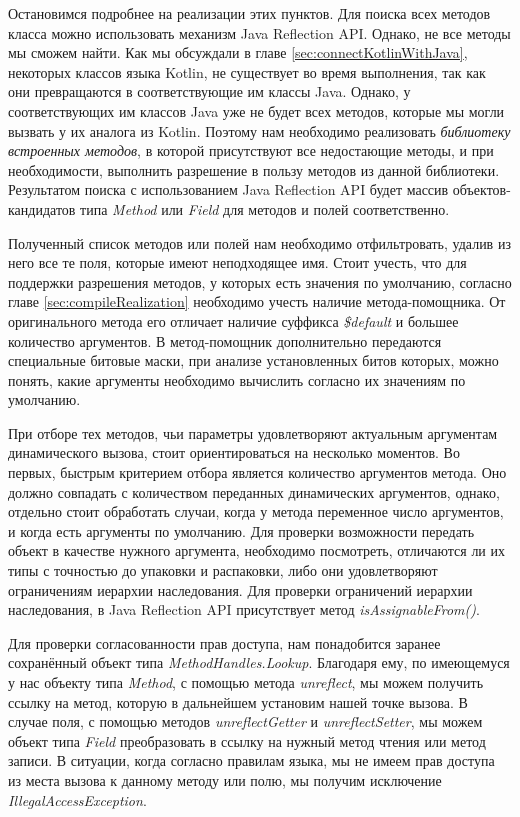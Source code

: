 Остановимся подробнее на реализации этих пунктов. Для поиска всех методов класса можно использовать механизм Java Reflection API. Однако, не все методы мы сможем найти. Как мы обсуждали в главе \ref{sec:connectKotlinWithJava}, некоторых классов языка Kotlin, не существует во время выполнения, так как они превращаются в соответствующие им классы Java. Однако, у соответствующих им классов Java уже не будет всех методов, которые мы могли вызвать у их аналога из Kotlin. Поэтому нам необходимо реализовать \textit{библиотеку встроенных методов}, в которой присутствуют все недостающие методы, и при необходимости, выполнить разрешение в пользу методов из данной библиотеки. Результатом поиска с использованием Java Reflection API будет массив объектов-кандидатов типа \textit{Method} или 
\textit{Field} для методов и полей соответственно.

Полученный список методов или полей нам необходимо отфильтровать, удалив из него все те поля, которые имеют неподходящее имя. Стоит учесть, что для поддержки разрешения методов, у которых есть значения по умолчанию, согласно главе \ref{sec:compileRealization} необходимо учесть наличие метода-помощника. От оригинального метода его отличает наличие суффикса \textit{\$default} и большее количество аргументов. В метод-помощник дополнительно передаются специальные битовые маски, при анализе установленных битов которых, можно понять, какие аргументы необходимо вычислить согласно их значениям по умолчанию.

При отборе тех методов, чьи параметры удовлетворяют актуальным аргументам динамического вызова, стоит ориентироваться на несколько моментов. Во первых, быстрым критерием отбора является количество аргументов метода. Оно должно совпадать с количеством переданных динамических аргументов, однако, отдельно стоит обработать случаи, когда у метода переменное число аргументов, и когда есть аргументы по умолчанию. Для проверки возможности передать объект в качестве нужного аргумента, необходимо посмотреть, отличаются ли их типы с точностью до упаковки и распаковки, либо они удовлетворяют ограничениям иерархии наследования. Для проверки ограничений иерархии наследования, в Java Reflection API присутствует метод \textit{isAssignableFrom()}.

Для проверки согласованности прав доступа, нам понадобится заранее сохранённый объект типа \textit{MethodHandles.Lookup}. Благодаря ему, по имеющемуся у нас объекту типа \textit{Method}, с помощью метода \textit{unreflect}, мы можем получить ссылку на метод, которую в дальнейшем установим нашей точке вызова. В случае поля, с помощью методов \textit{unreflectGetter} и 
\textit{unreflectSetter}, мы можем объект типа \textit{Field} преобразовать в ссылку на нужный метод чтения или метод записи. В ситуации, когда согласно правилам языка, мы не имеем прав доступа из места вызова к данному методу или полю, мы получим исключение \textit{IllegalAccessException}.

